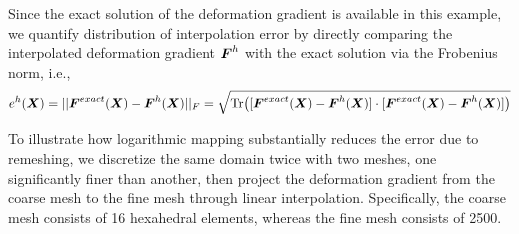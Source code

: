 \documentclass[12pt]{article}
\begin{document}
Since the exact solution of the deformation gradient is available in
this example, we quantify distribution of interpolation error by
directly comparing the interpolated deformation gradient ${\boldsymbol{F}}^{h}$
with the exact solution via the Frobenius norm, i.e.,
\begin{equation}
  e^{h}({\boldsymbol{X}}) = || {\boldsymbol{F}}^{exact} ({\boldsymbol{X}})- {\boldsymbol{F}}^{h}({\boldsymbol{X}}) ||_{F} 
  = \sqrt{\text{Tr}\big( [{\boldsymbol{F}}^{exact} ({\boldsymbol{X}})- {\boldsymbol{F}}^{h}({\boldsymbol{X}})] 
    \cdot [{\boldsymbol{F}}^{exact} ({\boldsymbol{X}})- {\boldsymbol{F}}^{h}({\boldsymbol{X}})] \big) }
  \label{eq:FrobeniusNormDistribution}
\end{equation} 

To illustrate how logarithmic mapping substantially reduces the error
due to remeshing, we discretize the same domain twice with two meshes,
one significantly finer than another, then project the deformation
gradient from the coarse mesh to the fine mesh through linear
interpolation.  Specifically, the coarse mesh consists of 16
hexahedral elements, whereas the fine mesh consists of 2500.
 
\end{document}
